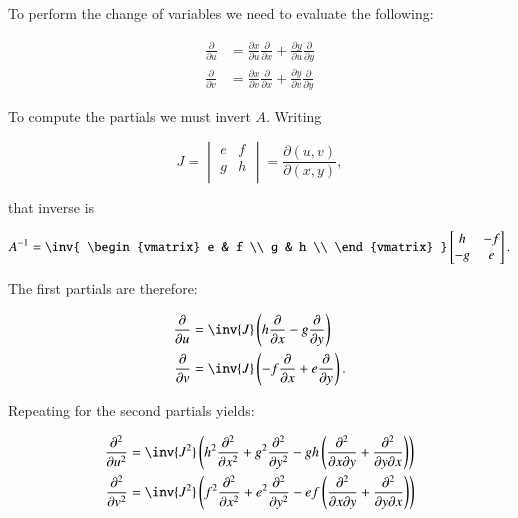 \documentclass{article}      %
\begin{document}
To perform the change of variables we need to evaluate the following:

\begin{align}
\frac{\partial}{\partial u}
&= \frac{\partial x}{\partial u} \frac{\partial}{\partial x} + \frac{\partial y}{\partial u} \frac{\partial}{\partial y} \\
\frac{\partial}{\partial v}
&= \frac{\partial x}{\partial v} \frac{\partial}{\partial x} + \frac{\partial y}{\partial v} \frac{\partial}{\partial y}
\end{align}

To compute the partials we must invert $A$.  Writing

\[
J =
\begin{vmatrix}
e & f \\
g & h \\
\end{vmatrix}
=
\frac{\partial(u,v)}{\partial(x,y)},
\]

that inverse is

\[
A^{-1} =
\inv
{
\begin{vmatrix}
e & f \\
g & h \\
\end{vmatrix}
}
\begin{bmatrix}
h & -f \\
-g & e \\
\end{bmatrix}.
\]

The first partials are therefore:

\begin{align}
\frac{\partial}{\partial u}
&= \inv{J} \left(h \frac{\partial}{\partial x} - g \frac{\partial}{\partial y}\right) \\
\frac{\partial}{\partial v}
&= \inv{J} \left(-f \frac{\partial}{\partial x} + e \frac{\partial}{\partial y}\right).
\end{align}

Repeating for the second partials yields:

\begin{align}
\frac{\partial^2}{\partial u^2}
&= \inv{J^2} \left(
h^2 \frac{\partial^2}{\partial x^2} + g^2 \frac{\partial^2}{\partial y^2}
-g h \left( \frac{\partial^2}{\partial x \partial y} + \frac{\partial^2}{\partial y \partial x} \right)
\right) \\
\frac{\partial^2}{\partial v^2}
&= \inv{J^2} \left(
f^2 \frac{\partial^2}{\partial x^2} + e^2 \frac{\partial^2}{\partial y^2}
-e f \left( \frac{\partial^2}{\partial x \partial y} + \frac{\partial^2}{\partial y \partial x} \right)
\right)
\end{align}
\end{document}
